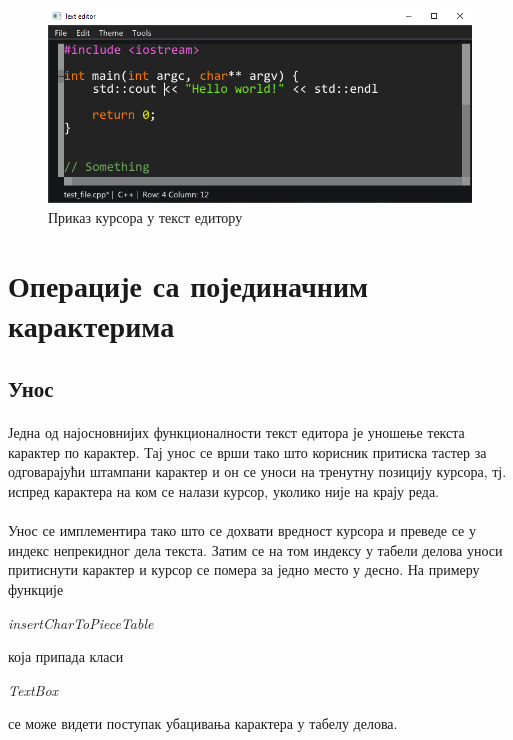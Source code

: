 \documentclass[12pt,oneside]{memoir}
\begin{document}
\begin{figure}[!ht]
	\centering
	\includegraphics[width=1.0\textwidth]{images/cursor.png}
	\caption{Приказ курсора у текст едитору}
	\label{fig:cursor}
\end{figure}

\section{Операције са појединачним карактерима}

\subsection{Унос}
\paragraph{}
Једна од најосновнијих функционалности текст едитора је уношење текста карактер
по карактер. Тај унос се врши тако што корисник притиска тастер за одговарајући
штампани карактер и он се уноси на тренутну позицију курсора, тј. испред карактера на ком се налази курсор, уколико није на крају реда. 

\paragraph{}
Унос се  имплементира тако што се дохвати вредност курсора и преведе се у индекс непрекидног
дела текста. Затим се на том индексу у табели делова уноси притиснути карактер и
курсор се помера за једно место у десно. На примеру функције 
\begin{latinica}\textit{insertCharToPieceTable}\end{latinica} која припада класи
\begin{latinica}\textit{TextBox}\end{latinica} се може видети поступак убацивања
карактера у табелу делова.
\end{document}
